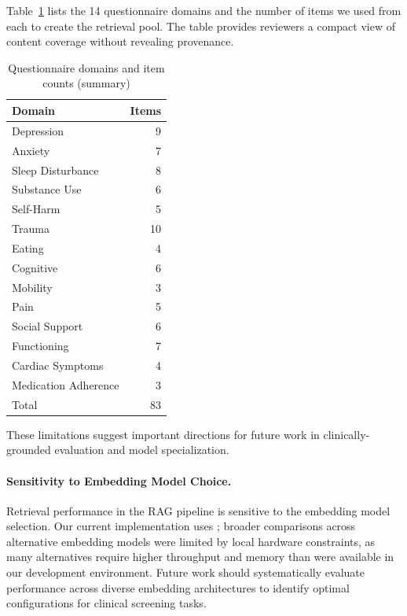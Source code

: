\documentclass[sigconf]{acmart}
\begin{document}
Table~\ref{tab:questionnaires} lists the 14 questionnaire domains and the number of items we used from each to create the retrieval pool. The table provides reviewers a compact view of content coverage without revealing provenance.

\begin{table}[htbp]
\caption{Questionnaire domains and item counts (summary)}
\label{tab:questionnaires}
\begin{center}
\begin{tabular}{lr}
\toprule
Domain & Items \\
\midrule
Depression & 9 \\
Anxiety & 7 \\
Sleep Disturbance & 8 \\
Substance Use & 6 \\
Self-Harm & 5 \\
Trauma & 10 \\
Eating & 4 \\
Cognitive & 6 \\
Mobility & 3 \\
Pain & 5 \\
Social Support & 6 \\
Functioning & 7 \\
Cardiac Symptoms & 4 \\
Medication Adherence & 3 \\
\midrule
Total & 83 \\
\bottomrule
\end{tabular}
\end{center}
\end{table}

These limitations suggest important directions for future work in clinically-grounded evaluation and model specialization.

\paragraph{Sensitivity to Embedding Model Choice.} Retrieval performance in the RAG pipeline is sensitive to the embedding model selection. Our current implementation uses \texttt{}; broader comparisons across alternative embedding models were limited by local hardware constraints, as many alternatives require higher throughput and memory than were available in our development environment. Future work should systematically evaluate performance across diverse embedding architectures to identify optimal configurations for clinical screening tasks.
\end{document}

